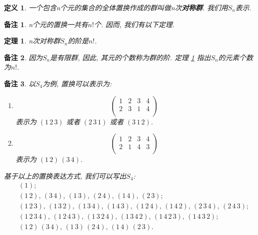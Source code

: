 \documentclass[utf8]{ctexbook}
\newtheorem{theorem}{定理}[section]
\newtheorem{definition}{定义}[section]
\newtheorem{memo}{备注}[section]
\begin{document}
\begin{definition}
一个包含n个元的集合的全体置换作成的群叫做n次\textbf{对称群}. 我们用$S_n$表示.
\end{definition}

\begin{memo}
n个元的置换一共有$n!$个. 因而, 我们有以下定理.
\end{memo}

\begin{theorem}\label{thm_Sn_rank}
n次对称群$S_n$的阶是$n!$.
\end{theorem}

\begin{memo}
因为$S_n$是有限群, 因此, 其元的个数称为群的阶. 定理 \ref{thm_Sn_rank} 指出$S_n$的元素个数为$n!$.
\end{memo}

\begin{memo}
以$S_4$为例, 置换可以表示为:
\begin{enumerate}
\item{
\begin{equation}\nonumber
\left(
\begin{array}{cccc}
1 & 2 & 3 & 4\\
2 & 3 & 1 & 4\\
\end{array}
\right)
\end{equation}
表示为 $(1\, 2\, 3)$ 或者 $(2 \, 3 \, 1)$ 或者 $(3 \, 1\, 2)$.
}
\item{
\begin{equation}\nonumber
\left(
\begin{array}{cccc}
1 & 2 & 3 & 4\\
2 & 1 & 4 & 3\\
\end{array}
\right)
\end{equation}
表示为 $(1\, 2)\, (3 \, 4)$.
}
\end{enumerate}
基于以上的置换表达方式, 我们可以写出$S_4$:
\begin{eqnarray*}
& & (1); \\
& & (1\, 2), \, (3\, 4), \, (1\, 3), \, (2\, 4), \, (1\, 4), \, (2\, 3); \\
& & (1 \, 2 \, 3), \, (1\, 3\, 2), \, (1 \, 3 \, 4), \, (1 \, 4 \, 3), \, (1 \, 2 \, 4), \, (1 \, 4 \, 2), \, (2 \, 3 \, 4), \, (2 \, 4 \, 3); \\ 
& & (1 \, 2 \, 3 \, 4), \, (1 \, 2 \, 4 \, 3), \, (1 \, 3 \, 2 \, 4), \, (1 \, 3 \, 4 \, 2), \, (1 \, 4 \, 2 \, 3), \, (1 \, 4 \, 3 \, 2); \\
& & (1 \, 2) \, (3 \, 4), \, (1 \, 3) \, (2 \, 4), \, (1 \, 4) \, (2 \, 3).
\end{eqnarray*}
\end{memo}
\end{document}
